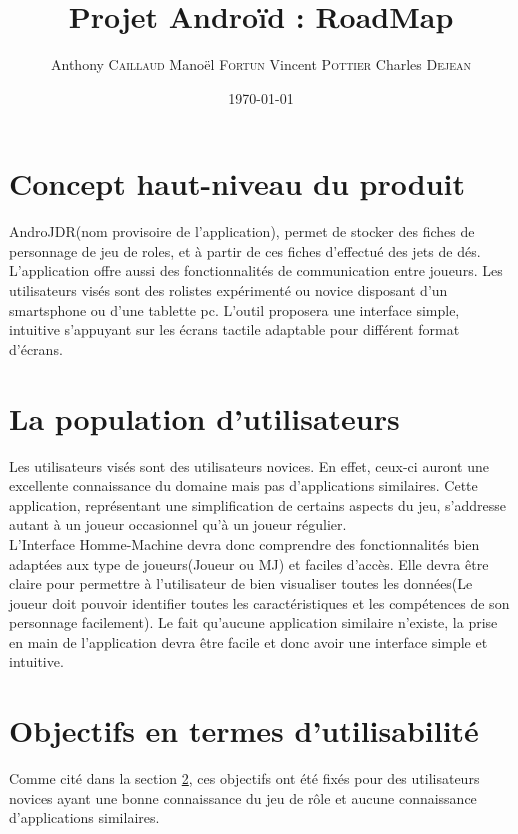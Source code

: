 \documentclass[11pt,a4paper]{article}
\title{Projet Androïd : RoadMap}
\author{Anthony \textsc{Caillaud} Manoël \textsc{Fortun} Vincent
\textsc{Pottier} Charles \textsc{Dejean}}
\date{\today}
\begin{document}
\maketitle

\clearpage
\tableofcontents
\clearpage
\section{Concept haut-niveau du produit}

AndroJDR(nom provisoire de l'application), permet de stocker des fiches de personnage de jeu de roles, et à partir de ces fiches d'effectué des jets de dés. L'application offre aussi des fonctionnalités de communication entre joueurs. Les utilisateurs visés sont des rolistes expérimenté ou novice disposant d'un smartsphone ou d'une tablette pc. L'outil proposera une interface simple, intuitive s'appuyant sur les écrans tactile adaptable pour différent format d'écrans.

\section{La population d'utilisateurs}
\label{utilisateurs}

Les utilisateurs visés sont des utilisateurs novices. En effet, ceux-ci auront
une excellente connaissance du domaine mais pas d'applications similaires.
Cette application, représentant une simplification de certains aspects du jeu,
s'addresse autant à un joueur occasionnel qu'à un joueur régulier.\\

L'Interface Homme-Machine devra donc comprendre des fonctionnalités bien
adaptées aux type de joueurs(Joueur ou MJ) et faciles d'accès. Elle devra être
claire pour permettre à l'utilisateur de bien visualiser toutes les données(Le
joueur doit pouvoir identifier toutes les caractéristiques et les compétences de
son personnage facilement). Le fait qu'aucune application similaire n'existe,
la prise en main de l'application devra être facile et donc avoir une interface
simple et intuitive.


\section{Objectifs en termes d'utilisabilité}

Comme cité dans la section \ref{utilisateurs}, ces objectifs ont été fixés pour
des utilisateurs novices ayant une bonne connaissance du jeu de rôle et aucune
connaissance d'applications similaires.\\
\end{document}
